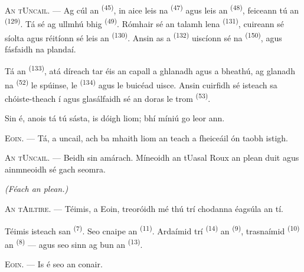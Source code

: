 \VUsaut{3.0mm}

\textsc{An tUncail}. --- Ag cúl an  \textsuperscript{(45)}, in
aice leis na  \textsuperscript{(47)} agus leis an
 \textsuperscript{(48)}, feiceann tú an 
\textsuperscript{(129)}. Tá sé ag ullmhú  bhig
\textsuperscript{(49)}. Rómhair sé an talamh lena 
\textsuperscript{(131)}, cuireann sé síolta agus réitíonn sé leis an
 \textsuperscript{(130)}. Ansin as a 
\textsuperscript{(132)} uiscíonn sé na  \textsuperscript{(150)},
agus fásfaidh na plandaí.

Tá an  \textsuperscript{(133)}, atá díreach tar éis an capall
a ghlanadh agus a bheathú, ag glanadh na  \textsuperscript{(52)} le
spúinse, le  \textsuperscript{(134)} agus le buicéad uisce.
Ansin cuirfidh sé isteach sa chóiste-theach í agus glasálfaidh sé an doras le
 trom \textsuperscript{(53)}.

Sin é, anois tá tú sásta, is dóigh liom; bhí míniú go leor ann.

\textsc{Eoin}. --- Tá, a uncail, ach ba mhaith liom an teach a fheiceáil ón taobh
istigh.

\textsc{An tUncail}. --- Beidh sin amárach. Míneoidh an tUasal Roux an plean duit
agus ainmneoidh sé gach seomra.

\VUsaut{3.0mm}
\VUsaut{2.4mm}

{\centering\textit{(Féach an plean.)}\par}
\VUsaut{2.4mm}

\textsc{An tAiltire}. --- Téimis, a Eoin, treoróidh mé thú trí chodanna éagsúla an
tí.

Téimis isteach san  \textsuperscript{(7)}. Seo cnaipe an
 \textsuperscript{(11)}. Ardaímid trí 
\textsuperscript{(14)} an  \textsuperscript{(9)}, trasnaímid
 \textsuperscript{(10)} an 
\textsuperscript{(8)} --- agus seo sinn ag bun an 
\textsuperscript{(13)}.

\textsc{Eoin}. --- Is é seo an conair.


